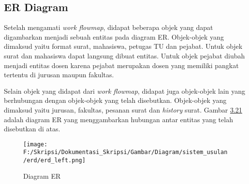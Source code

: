 \subsection{ER Diagram}
\label{sec:er_diagram}
Setelah mengamati \textit{work flowmap}, didapat beberapa objek yang dapat digambarkan menjadi sebuah entitas pada diagram ER. Objek-objek yang dimaksud yaitu format surat, mahasiswa, petugas TU dan pejabat. Untuk objek surat dan mahasiswa dapat langsung dibuat entitas. Untuk objek pejabat diubah menjadi entitas dosen karena pejabat merupakan dosen yang memiliki pangkat tertentu di jurusan maupun fakultas.\

Selain objek yang didapat dari \textit{work flowmap}, didapat juga objek-objek lain yang berhubungan dengan objek-objek yang telah disebutkan. Objek-objek yang dimaksud yaitu jurusan, fakultas, pesanan surat dan \textit{history} surat. Gambar \hyperlink{erd}{3.21} adalah diagram ER yang menggambarkan hubungan antar entitas yang telah disebutkan di atas.

\begin{figure}[H]
	\centering
		\texttt{[image: F:/Skripsi/Dokumentasi\_Skripsi/Gambar/Diagram/sistem\_usulan/erd/erd\_left.png]}
	\caption{Diagram ER}
	\label{fig:level_2-2}
\end{figure}
